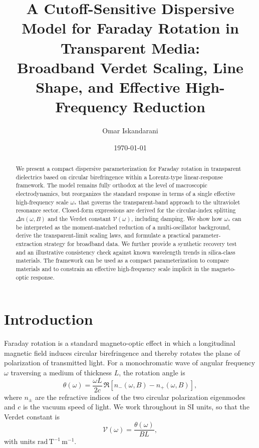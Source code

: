 \documentclass[11pt,a4paper]{article}
\title{A Cutoff-Sensitive Dispersive Model for Faraday Rotation in Transparent Media:\\
Broadband Verdet Scaling, Line Shape, and Effective High-Frequency Reduction}
\author{Omar Iskandarani}
\date{\today}
\begin{document}
    \maketitle
    
    \begin{abstract}
        We present a compact dispersive parameterization for Faraday rotation in transparent dielectrics based on circular birefringence within a Lorentz-type linear-response framework. The model remains fully orthodox at the level of macroscopic electrodynamics, but reorganizes the standard response in terms of a single effective high-frequency scale \(\omega_\ast\) that governs the transparent-band approach to the ultraviolet resonance sector. Closed-form expressions are derived for the circular-index splitting \(\Delta n(\omega,B)\) and the Verdet constant \(\mathcal{V}(\omega)\), including damping. We show how \(\omega_\ast\) can be interpreted as the moment-matched reduction of a multi-oscillator background, derive the transparent-limit scaling laws, and formulate a practical parameter-extraction strategy for broadband data. We further provide a synthetic recovery test and an illustrative consistency check against known wavelength trends in silica-class materials. The framework can be used as a compact parameterization to compare materials and to constrain an effective high-frequency scale implicit in the magneto-optic response.
    \end{abstract}
    
    \section{Introduction}
        
        Faraday rotation is a standard magneto-optic effect in which a longitudinal magnetic field induces circular birefringence and thereby rotates the plane of polarization of transmitted light. For a monochromatic wave of angular frequency \(\omega\) traversing a medium of thickness \(L\), the rotation angle is
        \begin{equation}
            \theta(\omega)=\frac{\omega L}{2c}\,\Re\!\left[n_-(\omega,B)-n_+(\omega,B)\right],
            \label{eq:theta_intro}
        \end{equation}
        where \(n_\pm\) are the refractive indices of the two circular polarization eigenmodes and \(c\) is the vacuum speed of light. We work throughout in SI units, so that the Verdet constant is
        \begin{equation}
            \mathcal{V}(\omega)=\frac{\theta(\omega)}{BL},
        \end{equation}
        with units \(\mathrm{rad\,T^{-1}\,m^{-1}}\).
        
\end{document}

